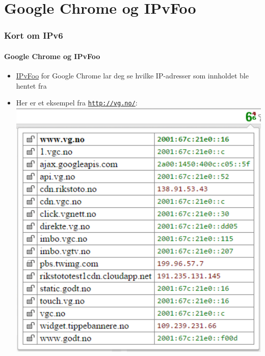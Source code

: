 \section{Google Chrome og IPvFoo}
\begin{frame}%
  \frametitle{Kort om IPv6}
  \framesubtitle{Google Chrome og IPvFoo}
  \pause
  \begin{itemize}[<+->]
  \item \href{https://code.google.com/p/ipvfoo/}{IPvFoo} for Google
    Chrome lar deg se hvilke IP-adresser som innholdet ble hentet fra
  \item Her er et eksempel fra \texttt{\url{http://vg.no/}}:\\
  \includegraphics[scale=.4]{vg-dot-no-og-IPvFoo-i-Google-Chrome.pdf}
  \end{itemize}
\end{frame}

